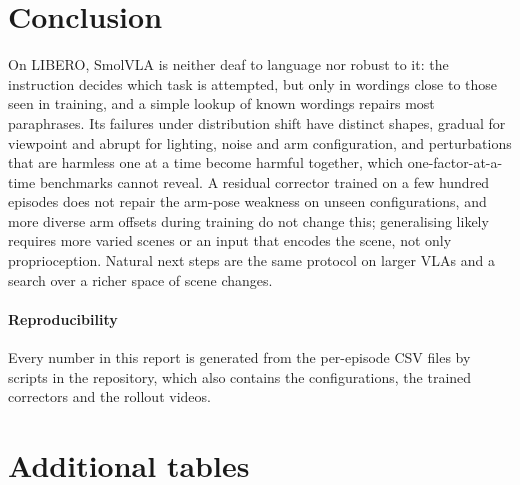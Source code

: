 \documentclass[10pt,twocolumn,letterpaper]{article}
\newcommand{\RLRandConclusion}{A residual corrector trained on a few hundred episodes does not repair the arm-pose weakness on unseen configurations, and more diverse arm offsets during training do not change this; generalising likely requires more varied scenes or an input that encodes the scene, not only proprioception.}
\begin{document}
\section{Conclusion}
On LIBERO, SmolVLA is neither deaf to language nor robust to it: the instruction decides which task is
attempted, but only in wordings close to those seen in training, and a simple lookup of known wordings
repairs most paraphrases. Its failures under distribution shift have distinct shapes, gradual for
viewpoint and abrupt for lighting, noise and arm configuration, and perturbations that are harmless one at a
time become harmful together, which one-factor-at-a-time benchmarks cannot reveal. \RLRandConclusion{}
Natural next steps are the same protocol on larger VLAs and a search over a richer space of scene changes.

\paragraph{Reproducibility} Every number in this report is generated from the per-episode CSV files by
scripts in the repository, which also contains the configurations, the trained correctors and the
rollout videos.

{\small

\setlength{\bibsep}{1.5pt}

}

\appendix
\section{Additional tables}
\begin{table}[h]
\centering
\caption{\textbf{Unperturbed successes per task} (out of 10).}
\label{tab:pertask}
\scriptsize
\setlength{\tabcolsep}{3pt}

\end{table}

\begin{table}[h]
\centering
\caption{\textbf{PPO configuration}, read from the saved checkpoints.}
\label{tab:ppo}
\scriptsize

\end{table}

\begin{table}[h]
\centering
\caption{\textbf{Compute.} Wall-clock time on an Apple M1 laptop (8\,GB), one process at a time.}
\label{tab:compute}
\scriptsize

\end{table}
\end{document}
